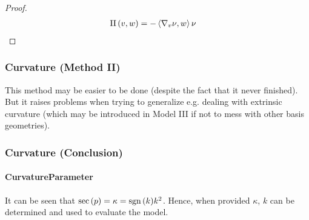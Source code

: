 \documentclass[stu, babel, american, biblatex, a4paper, draftall]{apa7}
\begin{document}
\begin{lemma}\label{Model:SecondFundamental}
\end{lemma}
\begin{proof}
    \skipped

    \begin{align*}
        \text{II}\left(v,w\right)
        &= -\left\langle{\nabla_v \nu},{w}\right\rangle \nu
    \end{align*}
\end{proof}
\begin{lemma}\label{Model:PrincipalCurvature}

\end{lemma}
\subsubsection{Curvature (Method II)}
This method may be easier to be done
(despite the fact that it never finished).
But it raises problems when trying to generalize e.g. dealing with extrinsic curvature
(which may be introduced in Model III
if not to mess with other basis geometries).
\begin{lemma}\label{Model:ChristoffelSymbol}

\end{lemma}
\begin{lemma}\label{Model:RiemannCurvatureTensor}

\end{lemma}
\subsubsection{Curvature (Conclusion)}
\begin{lemma}\label{Model:SectionalCurvature}

\end{lemma}
\paragraph{CurvatureParameter}
It can be seen that $\operatorname{sec}\left(p\right) = \kappa = \operatorname{sgn}{\left(k\right)}k^2$.
Hence, when provided $\kappa$, $k$ can be determined and used to evaluate the model.
\end{document}

